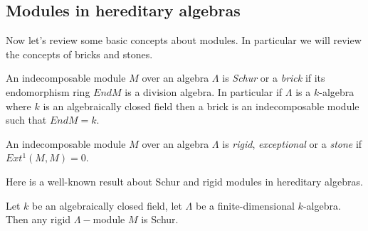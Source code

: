 \subsection{Modules in hereditary algebras}
\indent Now let's review some basic concepts about modules. In particular we will review the concepts of bricks and stones.\\
\begin{definition}
\indent An indecomposable module $M$ over an algebra $\Lambda$ is \textit{Schur} or a \textit{brick} if its endomorphism ring $End M$ is a division algebra. In particular if $\Lambda$ is a $k$-algebra where $k$ is an algebraically closed field then a brick is an indecomposable module such that $End M=k$.
\end{definition}
\begin{definition}
\indent An indecomposable module $M$ over an algebra $\Lambda$ is \textit{rigid}, \textit{exceptional} or a \textit{stone} if $Ext^1 (M,M)=0$.
\end{definition}
\indent Here is a well-known result about Schur and rigid modules in hereditary algebras.
\begin{theorem}
\indent \cite{ASS06}Let $k$ be an algebraically closed field, let $\Lambda$ be a finite-dimensional $k$-algebra. Then any rigid $\Lambda-$module $M$ is Schur.
\end{theorem}
